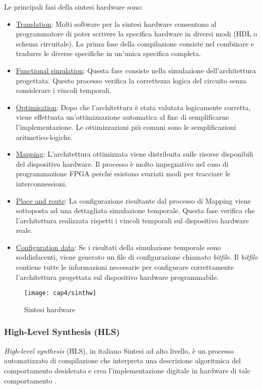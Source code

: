Le principali fasi della sintesi hardware sono:
\begin{itemize}
	\item \underline{Translation}: Molti software per la sintesi hardware consentono al programmatore di poter scrivere la specifica hardware in diversi modi (HDL o schema circuitale). La prima fase della compilazione consiste nel combinare e tradurre le diverse specifiche in un'unica specifica completa.
	\item \underline{Functional simulation}: Questa fase consiste nella simulazione dell'architettura progettata. Questo processo verifica la correttezza logica del circuito senza considerare i vincoli temporali.
	\item \underline{Optimisation}: Dopo che l'architettura è stata valutata logicamente corretta, viene effettuata un'ottimizzazione automatica al fine di semplificarne l'implementazione. Le ottimizzazioni più comuni sono le semplificazioni aritmetico-logiche.
	\item \underline{Mapping}: L'architettura ottimizzata viene distribuita sulle risorse disponibili del dispositivo hardware. Il processo è molto impegnativo nel caso di programmazione FPGA perché esistono svariati modi per tracciare le interconnessioni.
	\item \underline{Place and route}: La configurazione risultante dal processo di Mapping viene sottoposta ad una dettagliata simulazione temporale. Questa fase verifica che l'architettura realizzata rispetti i vincoli temporali sul dispositivo hardware reale.
	\item \underline{Configuration data}: Se i risultati della simulazione temporale sono soddisfacenti, viene generato un file di configurazione chiamato \textit{bitfile}. Il \textit{bitfile} contiene tutte le informazioni necessarie per configurare correttamente l'architettura progettata sul dispositivo hardware programmabile.
\end{itemize}

\begin{figure}  
  \begin{center}
    \texttt{[image: cap4/sinthw]}
    \caption{Sintesi hardware}
  \end{center}
\end{figure}
		
\subsubsection{High-Level Synthesis (HLS)}
\textit{High-level synthesis} (HLS), in italiano Sintesi ad alto livello, è un processo automatizzato di compilazione che interpreta una descrizione algoritmica del comportamento desiderato e crea l'implementazione digitale in hardware di tale comportamento \cite{Coussy:2008:HSA:1457713}.

